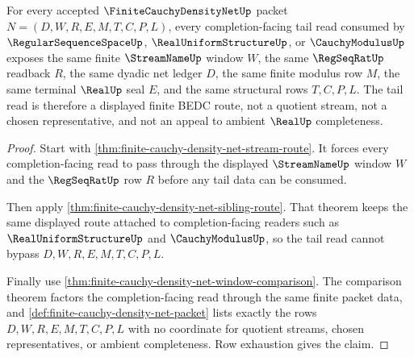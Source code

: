 \begin{theorem}
\label{thm:finite-cauchy-density-net-tail-extraction}
For every accepted $\FiniteCauchyDensityNetUp$ packet $N=(D,W,R,E,M,T,C,P,L)$, every completion-facing tail read consumed by $\RegularSequenceSpaceUp$, $\RealUniformStructureUp$, or $\CauchyModulusUp$ exposes the same finite $\StreamNameUp$ window $W$, the same $\RegSeqRatUp$ readback $R$, the same dyadic net ledger $D$, the same finite modulus row $M$, the same terminal $\RealUp$ seal $E$, and the same structural rows $T,C,P,L$. The tail read is therefore a displayed finite BEDC route, not a quotient stream, not a chosen representative, and not an appeal to ambient $\RealUp$ completeness.
\end{theorem}
\begin{proof}
Start with \autoref{thm:finite-cauchy-density-net-stream-route}. It forces every completion-facing read to pass through the displayed $\StreamNameUp$ window $W$ and the $\RegSeqRatUp$ row $R$ before any tail data can be consumed.

Then apply \autoref{thm:finite-cauchy-density-net-sibling-route}. That theorem keeps the same displayed route attached to completion-facing readers such as $\RealUniformStructureUp$ and $\CauchyModulusUp$, so the tail read cannot bypass $D,W,R,E,M,T,C,P,L$.

Finally use \autoref{thm:finite-cauchy-density-net-window-comparison}. The comparison theorem factors the completion-facing read through the same finite packet data, and \autoref{def:finite-cauchy-density-net-packet} lists exactly the rows $D,W,R,E,M,T,C,P,L$ with no coordinate for quotient streams, chosen representatives, or ambient completeness. Row exhaustion gives the claim.
\end{proof}

